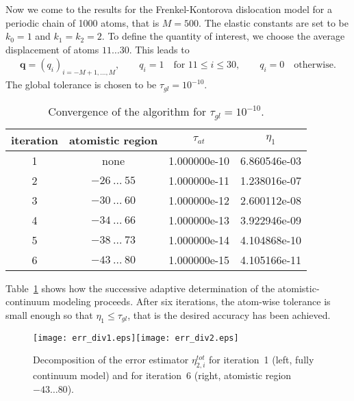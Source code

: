 \documentclass[11pt,reqno,oneside]{amsart}
\numberwithin{equation}{section}
\begin{document}
Now we come to the results for the Frenkel-Kontorova dislocation model for a periodic
chain of 1000 atoms, that is $M=500$.  The elastic constants are set to be $k_0=1$ and
$k_1=k_2=2$. To define the quantity of interest, we choose the average
displacement of atoms $11\ldots30$.  This leads to
\begin{align}
  {\mathbf{q}} = (q_i)_{i=-M+1,\ldots,M}, \qquad
  q_i = 1 \quad \text{for } 11 \le i \le 30, \qquad
  q_i = 0 \quad \text{otherwise.}
\end{align}
The global tolerance is chosen to be $\tau_{gl}=10^{-10}$.

\begin{table}
\begin{tabular}{|c|c|c|c|}
\hline
iteration & atomistic region & $\tau_{at}$ & $\eta_1$ \\
\hline
   1 & none                  & 1.000000e-10 & 6.860546e-03 \\
   2 & $-26 \: \ldots \: 55$ & 1.000000e-11 & 1.238016e-07 \\
   3 & $-30 \: \ldots \: 60$ & 1.000000e-12 & 2.600112e-08 \\
   4 & $-34 \: \ldots \: 66$ & 1.000000e-13 & 3.922946e-09 \\
   5 & $-38 \: \ldots \: 73$ & 1.000000e-14 & 4.104868e-10 \\
   6 & $-43 \: \ldots \: 80$ & 1.000000e-15 & 4.105166e-11 \\
\hline
\end{tabular}
\caption{\label{TabConvergence} Convergence of the algorithm for $\tau_{gl}=10^{-10}$.}
\end{table}

Table~\ref{TabConvergence} shows how the successive adaptive determination
of the atomistic-continuum modeling
proceeds. After six iterations, the atom-wise tolerance is small enough so that
$\eta_1 \le \tau_{gl}$, that is the desired accuracy has been achieved.

\begin{figure}
\texttt{[image: err\_div1.eps]}\texttt{[image: err\_div2.eps]}
\caption{Decomposition of the error estimator $\eta_{2,i}^{tot}$
for iteration~1 (left, fully continuum model) and for iteration~6
(right, atomistic region $-43\ldots80$).}
\label{FigAtomWise}
\end{figure}
\end{document}
